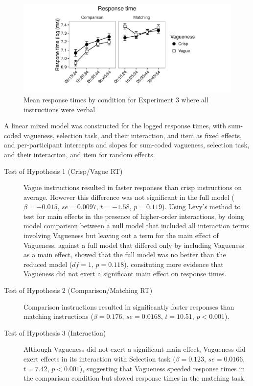 \begin{figure}[htbp]
\centering
\includegraphics[width=\textwidth]{figures/Ee3-rtplot-1.pdf}
\caption{Mean response times by condition for Experiment 3 where all instructions were verbal}
\label{resultsE-exp-3}
\end{figure}

A linear mixed model was constructed for the logged response times, with sum-coded vagueness, selection task, and their interaction, and item as fixed effects, and per-participant intercepts and slopes for sum-coded vagueness, selection task, and their interaction, and item for random effects.

\begin{description}
	\item [Test of Hypothesis 1 (Crisp/Vague RT)] Vague instructions resulted in faster responses than crisp instructions on average. However this difference was not significant in the full model ($\beta=-0.015$, $se=0.0097$, $t=-1.58$, $p=0.119$). Using Levy's method \citep{Levy:MainEffectsInteractions} to test for main effects in the presence of higher-order interactions, by doing model comparison between a null model that included all interaction terms involving Vagueness but leaving out a term for the main effect of Vagueness, against a full model that differed only by including Vagueness as a main effect, showed that the full model was no better than the reduced model ($df=1$, $p=0.118$), consituting more evidence that Vagueness did not exert a significant main effect on response times. 
	\item [Test of Hypothesis 2 (Comparison/Matching RT)] Comparison instructions resulted in significantly faster responses than matching instructions ($\beta=0.176$, $se=0.0168$, $t=10.51$, $p<0.001$).
	\item [Test of Hypothesis 3 (Interaction)] Although Vagueness did not exert a significant main effect, Vagueness did exert effects in its interaction with Selection task ($\beta=0.123$, $se=0.0166$, $t=7.42$, $p<0.001$), suggesting that Vagueness speeded response times in the comparison condition but slowed response times in the matching task. 
\end{description}

